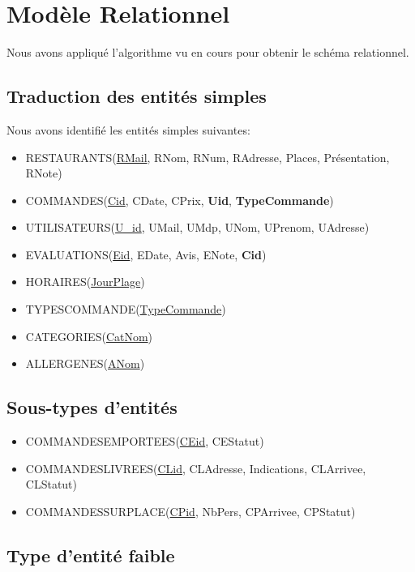 \documentclass[10pt, a4paper]{article}
\begin{document}
\section{Modèle Relationnel}

Nous avons appliqué l'algorithme vu en cours pour obtenir le schéma relationnel.

\subsection{Traduction des entités simples}

Nous avons identifié les entités simples suivantes:

\begin{itemize}
    \item RESTAURANTS\@(\underline{RMail}, RNom, RNum, RAdresse, Places, Présentation, RNote)
    \item COMMANDES\@(\underline{Cid}, CDate, CPrix, \textbf{Uid}, \textbf{TypeCommande})
    \item UTILISATEURS\@(\underline{U\_id}, UMail, UMdp, UNom, UPrenom, UAdresse)
    \item EVALUATIONS\@(\underline{Eid}, EDate, Avis, ENote, \textbf{Cid})
    \item HORAIRES\@(\underline{JourPlage})
    \item TYPESCOMMANDE\@(\underline{TypeCommande})
    \item CATEGORIES\@(\underline{CatNom})
    \item ALLERGENES\@(\underline{ANom})
\end{itemize}

\subsection{Sous-types d'entités}

\begin{itemize}
    \item COMMANDESEMPORTEES\@(\underline{CEid}, CEStatut)
    \item COMMANDESLIVREES\@(\underline{CLid}, CLAdresse, Indications, CLArrivee, CLStatut)
    \item COMMANDESSURPLACE\@(\underline{CPid}, NbPers, CPArrivee, CPStatut)
\end{itemize}

\subsection{Type d'entité faible}
\end{document}
